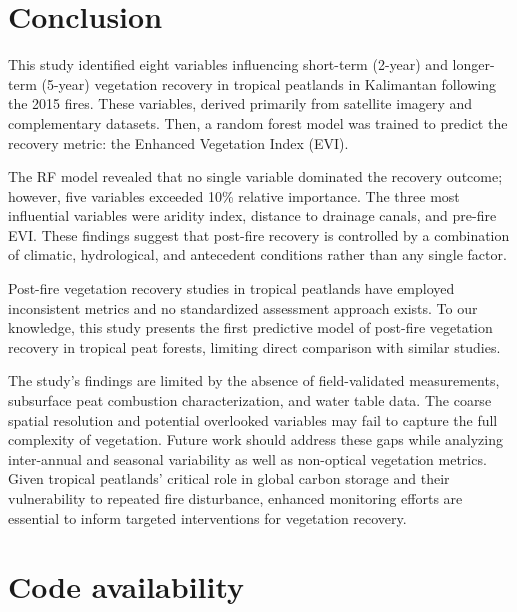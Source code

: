 \documentclass[
  fontsize=12pt,
  paper=a4,
  parskip=half,
  headings=big,
  DIV=12
]{scrreprt}
\begin{document}
\chapter{Conclusion}


This study identified eight variables influencing short-term (2-year) and longer-term (5-year) vegetation recovery in tropical peatlands in Kalimantan following the 2015 fires. These variables, derived primarily from satellite imagery and complementary datasets. Then, a random forest model was trained to predict the recovery metric: the Enhanced Vegetation Index (EVI).

The RF model revealed that no single variable dominated the recovery outcome; however, five variables exceeded 10\% relative importance. The three most influential variables were aridity index, distance to drainage canals, and pre-fire EVI. These findings suggest that post-fire recovery is controlled by a combination of climatic, hydrological, and antecedent conditions rather than any single factor.

Post-fire vegetation recovery studies in tropical peatlands have employed inconsistent metrics and no standardized assessment approach exists. To our knowledge, this study presents the first predictive model of post-fire vegetation recovery in tropical peat forests, limiting direct comparison with similar studies.

The study's findings are limited by the absence of field-validated measurements, subsurface peat combustion characterization, and water table data. The coarse spatial resolution and potential overlooked variables may fail to capture the full complexity of vegetation. Future work should address these gaps while analyzing inter-annual and seasonal variability as well as non-optical vegetation metrics. Given tropical peatlands' critical role in global carbon storage and their vulnerability to repeated fire disturbance, enhanced monitoring efforts are essential to inform targeted interventions for vegetation recovery.

\chapter*{Code availability}
\end{document}
